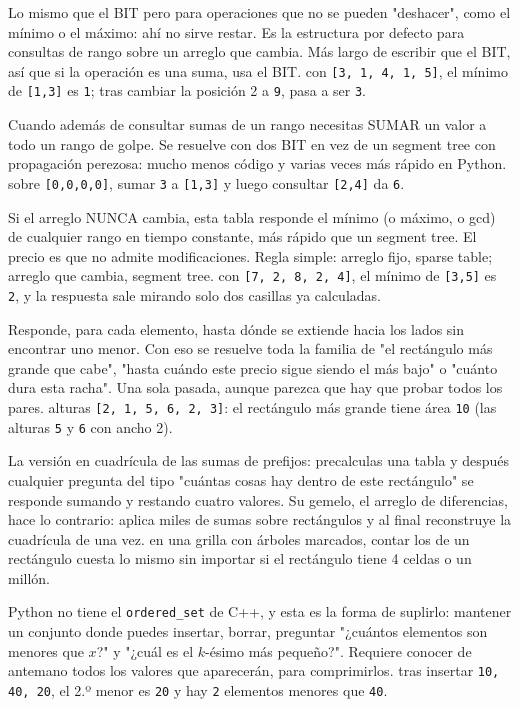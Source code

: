 Lo mismo que el BIT pero para operaciones que no se pueden "deshacer", como el
mínimo o el máximo: ahí no sirve restar. Es la estructura por defecto para
consultas de rango sobre un arreglo que cambia. Más largo de escribir que el BIT,
así que si la operación es una suma, usa el BIT.
\ej con \texttt{[3, 1, 4, 1, 5]}, el mínimo de \texttt{[1,3]} es \texttt{1}; tras
cambiar la posición 2 a \texttt{9}, pasa a ser \texttt{3}.

Cuando además de consultar sumas de un rango necesitas SUMAR un valor a todo un
rango de golpe. Se resuelve con dos BIT en vez de un segment tree con propagación
perezosa: mucho menos código y varias veces más rápido en Python.
\ej sobre \texttt{[0,0,0,0]}, sumar \texttt{3} a \texttt{[1,3]} y luego consultar
\texttt{[2,4]} da \texttt{6}.

Si el arreglo NUNCA cambia, esta tabla responde el mínimo (o máximo, o gcd) de
cualquier rango en tiempo constante, más rápido que un segment tree. El precio es
que no admite modificaciones. Regla simple: arreglo fijo, sparse table; arreglo que
cambia, segment tree.
\ej con \texttt{[7, 2, 8, 2, 4]}, el mínimo de \texttt{[3,5]} es \texttt{2}, y la
respuesta sale mirando solo dos casillas ya calculadas.

Responde, para cada elemento, hasta dónde se extiende hacia los lados sin encontrar
uno menor. Con eso se resuelve toda la familia de "el rectángulo más grande que
cabe", "hasta cuándo este precio sigue siendo el más bajo" o "cuánto dura esta
racha". Una sola pasada, aunque parezca que hay que probar todos los pares.
\ej alturas \texttt{[2, 1, 5, 6, 2, 3]}: el rectángulo más grande tiene área
\texttt{10} (las alturas \texttt{5} y \texttt{6} con ancho 2).

La versión en cuadrícula de las sumas de prefijos: precalculas una tabla y después
cualquier pregunta del tipo "cuántas cosas hay dentro de este rectángulo" se
responde sumando y restando cuatro valores. Su gemelo, el arreglo de diferencias,
hace lo contrario: aplica miles de sumas sobre rectángulos y al final reconstruye
la cuadrícula de una vez.
\ej en una grilla con árboles marcados, contar los de un rectángulo cuesta lo mismo
sin importar si el rectángulo tiene 4 celdas o un millón.

Python no tiene el \texttt{ordered\_set} de C++, y esta es la forma de suplirlo:
mantener un conjunto donde puedes insertar, borrar, preguntar "¿cuántos elementos
son menores que $x$?" y "¿cuál es el $k$-ésimo más pequeño?". Requiere conocer de
antemano todos los valores que aparecerán, para comprimirlos.
\ej tras insertar \texttt{10, 40, 20}, el 2.º menor es \texttt{20} y hay
\texttt{2} elementos menores que \texttt{40}.

